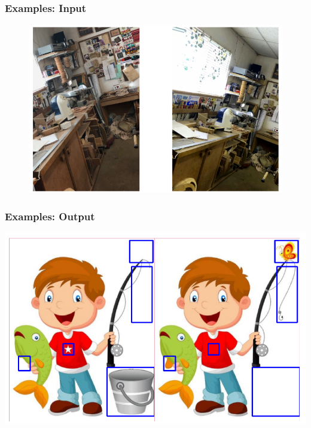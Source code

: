 \documentclass[13.5pt,aspecratio=169, xcolor=dvipsnames]{beamer}
\begin{document}
        \begin{frame}
            \onehalfspacing
                \frametitle{Examples: Input}
                \begin{figure}[h]
                \centering
                \includegraphics[scale=0.5]{Example/Example_1.png}
                \end{figure}
            \end{frame}
    

            \begin{frame}
            \onehalfspacing
                \frametitle{Examples: Output}
                \hspace{1em}
                \includegraphics[scale=0.5]{Example/Fishing_boy_bb.png}
            \end{frame}
        
\end{document}
